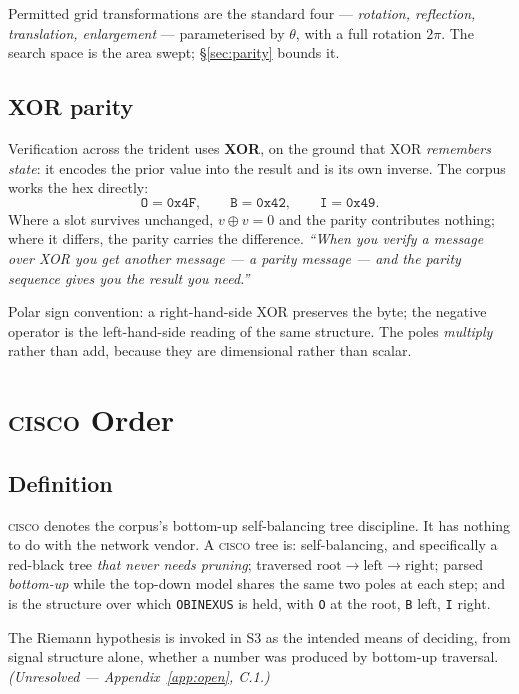 \documentclass[11pt,a4paper]{article}
\newcommand{\CISCO}{\textsc{cisco}}
\newcommand{\OBI}{\texttt{OBINEXUS}}
\begin{document}
Permitted grid transformations are the standard four --- \emph{rotation,
reflection, translation, enlargement} --- parameterised by $\theta$, with a full
rotation $2\pi$. The search space is the area swept; \S\ref{sec:parity} bounds
it.

\subsection{XOR parity}
\label{sec:xor}

Verification across the trident uses \textbf{XOR}, on the ground that XOR
\emph{remembers state}: it encodes the prior value into the result and is its
own inverse. The corpus works the hex directly:
\[
\texttt{O} = \texttt{0x4F}, \qquad
\texttt{B} = \texttt{0x42}, \qquad
\texttt{I} = \texttt{0x49}.
\]
Where a slot survives unchanged, $v \oplus v = 0$ and the parity contributes
nothing; where it differs, the parity carries the difference. \emph{``When you
verify a message over XOR you get another message --- a parity message --- and
the parity sequence gives you the result you need.''}

Polar sign convention: a right-hand-side XOR preserves the byte; the negative
operator is the left-hand-side reading of the same structure. The poles
\emph{multiply} rather than add, because they are dimensional rather than
scalar.

\section{\CISCO{} Order}
\label{sec:cisco}

\subsection{Definition}

\CISCO{} denotes the corpus's bottom-up self-balancing tree discipline. It has
nothing to do with the network vendor. A \CISCO{} tree is: self-balancing, and
specifically a red-black tree \emph{that never needs pruning}; traversed
$\text{root} \rightarrow \text{left} \rightarrow \text{right}$; parsed
\emph{bottom-up} while the top-down model shares the same two poles at each
step; and is the structure over which \OBI{} is held, with \texttt{O} at the
root, \texttt{B} left, \texttt{I} right.

The Riemann hypothesis is invoked in S3 as the intended means of deciding, from
signal structure alone, whether a number was produced by bottom-up traversal.
\emph{(Unresolved --- Appendix~\ref{app:open}, C.1.)}
\end{document}
